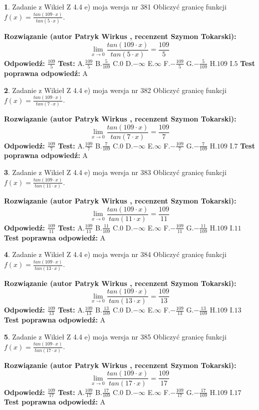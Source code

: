\documentclass[12pt, a4paper]{article}
\theoremstyle{definition} %
\newtheorem{zad}{}
\newcommand{\zadStart}[1]{\begin{zad}#1\newline}
\newcommand{\zadStop}{\end{zad}}
\newcommand{\rozwStart}[2]{\noindent \textbf{Rozwiązanie (autor #1 , recenzent #2): }\newline}
\newcommand{\rozwStop}{\newline}
\newcommand{\odpStart}{\noindent \textbf{Odpowiedź:}\newline}
\newcommand{\odpStop}{\newline}
\newcommand{\testStart}{\noindent \textbf{Test:}\newline}
\newcommand{\testStop}{\newline}
\newcommand{\kluczStart}{\noindent \textbf{Test poprawna odpowiedź:}\newline}
\newcommand{\kluczStop}{\newline}
\begin{document}
\zadStart{Zadanie z Wikieł Z 4.4 e) moja wersja nr 381}
Obliczyć granicę funkcji $f(x)=\frac{tan(109\cdot x)}{tan(5\cdot x)}$.
\zadStop
\rozwStart{Patryk Wirkus}{Szymon Tokarski}
$$\lim\limits_{x\to 0}\frac{tan(109\cdot x)}{tan(5\cdot x)}=
\frac{109}{5}$$
\rozwStop
\odpStart
$\frac{109}{5}$
\odpStop
\testStart
A.$\frac{109}{5}$
B.$\frac{5}{109}$
C.$0$
D.$-\infty$
E.$\infty$
F.$-\frac{109}{5}$
G.$-\frac{5}{109}$
H.$109$
I.$5$
\testStop
\kluczStart
A
\kluczStop



\zadStart{Zadanie z Wikieł Z 4.4 e) moja wersja nr 382}
Obliczyć granicę funkcji $f(x)=\frac{tan(109\cdot x)}{tan(7\cdot x)}$.
\zadStop
\rozwStart{Patryk Wirkus}{Szymon Tokarski}
$$\lim\limits_{x\to 0}\frac{tan(109\cdot x)}{tan(7\cdot x)}=
\frac{109}{7}$$
\rozwStop
\odpStart
$\frac{109}{7}$
\odpStop
\testStart
A.$\frac{109}{7}$
B.$\frac{7}{109}$
C.$0$
D.$-\infty$
E.$\infty$
F.$-\frac{109}{7}$
G.$-\frac{7}{109}$
H.$109$
I.$7$
\testStop
\kluczStart
A
\kluczStop



\zadStart{Zadanie z Wikieł Z 4.4 e) moja wersja nr 383}
Obliczyć granicę funkcji $f(x)=\frac{tan(109\cdot x)}{tan(11\cdot x)}$.
\zadStop
\rozwStart{Patryk Wirkus}{Szymon Tokarski}
$$\lim\limits_{x\to 0}\frac{tan(109\cdot x)}{tan(11\cdot x)}=
\frac{109}{11}$$
\rozwStop
\odpStart
$\frac{109}{11}$
\odpStop
\testStart
A.$\frac{109}{11}$
B.$\frac{11}{109}$
C.$0$
D.$-\infty$
E.$\infty$
F.$-\frac{109}{11}$
G.$-\frac{11}{109}$
H.$109$
I.$11$
\testStop
\kluczStart
A
\kluczStop



\zadStart{Zadanie z Wikieł Z 4.4 e) moja wersja nr 384}
Obliczyć granicę funkcji $f(x)=\frac{tan(109\cdot x)}{tan(13\cdot x)}$.
\zadStop
\rozwStart{Patryk Wirkus}{Szymon Tokarski}
$$\lim\limits_{x\to 0}\frac{tan(109\cdot x)}{tan(13\cdot x)}=
\frac{109}{13}$$
\rozwStop
\odpStart
$\frac{109}{13}$
\odpStop
\testStart
A.$\frac{109}{13}$
B.$\frac{13}{109}$
C.$0$
D.$-\infty$
E.$\infty$
F.$-\frac{109}{13}$
G.$-\frac{13}{109}$
H.$109$
I.$13$
\testStop
\kluczStart
A
\kluczStop



\zadStart{Zadanie z Wikieł Z 4.4 e) moja wersja nr 385}
Obliczyć granicę funkcji $f(x)=\frac{tan(109\cdot x)}{tan(17\cdot x)}$.
\zadStop
\rozwStart{Patryk Wirkus}{Szymon Tokarski}
$$\lim\limits_{x\to 0}\frac{tan(109\cdot x)}{tan(17\cdot x)}=
\frac{109}{17}$$
\rozwStop
\odpStart
$\frac{109}{17}$
\odpStop
\testStart
A.$\frac{109}{17}$
B.$\frac{17}{109}$
C.$0$
D.$-\infty$
E.$\infty$
F.$-\frac{109}{17}$
G.$-\frac{17}{109}$
H.$109$
I.$17$
\testStop
\kluczStart
A
\kluczStop
\end{document}
